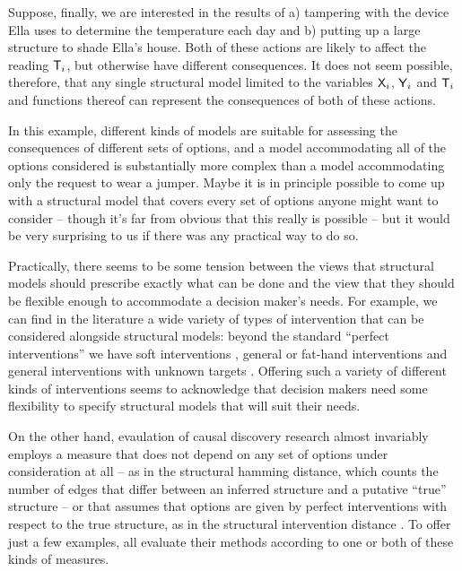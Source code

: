 \begin{example}
Suppose, finally, we are interested in the results of a) tampering with the device Ella uses to determine the temperature each day and b) putting up a large structure to shade Ella's house. Both of these actions are likely to affect the reading $\mathsf{T}_i$, but otherwise have different consequences. It does not seem possible, therefore, that any single structural model limited to the variables $\mathsf{X}_i$, $\mathsf{Y}_i$ and $\mathsf{T}_i$ and functions thereof can represent the consequences of both of these actions.
\end{example}

In this example, different kinds of models are suitable for assessing the consequences of different sets of options, and a model accommodating all of the options considered is substantially more complex than a model accommodating only the request to wear a jumper. Maybe it is in principle possible to come up with a structural model that covers every set of options anyone might want to consider -- though it's far from obvious that this really is possible -- but it would be very surprising to us if there was any practical way to do so.

Practically, there seems to be some tension between the views that structural models should prescribe exactly what can be done and the view that they should be flexible enough to accommodate a decision maker's needs. For example, we can find in the literature a wide variety of types of intervention that can be considered alongside structural models: beyond the standard ``perfect interventions'' \citep[ch. ~1]{pearl_causality:_2009,hauser_characterization_2012} we have soft interventions \citep{correa_calculus_2020,eberhardt_interventions_2007}, general or fat-hand interventions \citep{eberhardt_interventions_2007,yang_characterizing_2018,glymour_evaluating_2017} and general interventions with unknown targets \citep{brouillard_differentiable_2020}. Offering such a variety of different kinds of interventions seems to acknowledge that decision makers need some flexibility to specify structural models that will suit their needs.

On the other hand, evaulation of causal discovery research almost invariably employs a measure that does not depend on any set of options under consideration at all -- as in the structural hamming distance, which counts the number of edges that differ between an inferred structure and a putative ``true'' structure -- or that assumes that options are given by perfect interventions with respect to the true structure, as in the structural intervention distance \citep{peters_structural_2015}. To offer just a few examples, \citet{brouillard_differentiable_2020,scherrer_learning_2022,toth_active_2022,forre_constraint-based_2018,chickering_optimal_2003,ng_graph_2019,zheng_dags_2018,spirtes_causation_1993} all evaluate their methods according to one or both of these kinds of measures.

